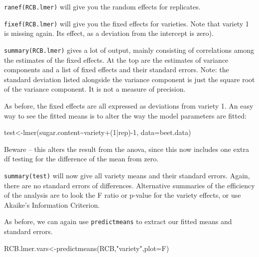 \documentclass[
]{book}
\makeatletter
\newenvironment{Shaded}{\begin{snugshade}}{\end{snugshade}}
\newcommand{\AttributeTok}[1]{\textcolor[rgb]{0.77,0.63,0.00}{#1}}
\newcommand{\DecValTok}[1]{\textcolor[rgb]{0.00,0.00,0.81}{#1}}
\newcommand{\FunctionTok}[1]{\textcolor[rgb]{0.00,0.00,0.00}{#1}}
\newcommand{\NormalTok}[1]{#1}
\newcommand{\OtherTok}[1]{\textcolor[rgb]{0.56,0.35,0.01}{#1}}
\newcommand{\SpecialCharTok}[1]{\textcolor[rgb]{0.00,0.00,0.00}{#1}}
\newcommand{\StringTok}[1]{\textcolor[rgb]{0.31,0.60,0.02}{#1}}
\newenvironment{kframe}{%
\medskip{}
\setlength{\fboxsep}{.8em}
 \def\at@end@of@kframe{}%
 \ifinner\ifhmode%
  \def\at@end@of@kframe{\end{minipage}}%
  \begin{minipage}{\columnwidth}%
 \fi\fi%
 \def\FrameCommand##1{\hskip\@totalleftmargin \hskip-\fboxsep
 \colorbox{shadecolor}{##1}\hskip-\fboxsep
     \hskip-\linewidth \hskip-\@totalleftmargin \hskip\columnwidth}%
 \MakeFramed {\advance\hsize-\width
   \@totalleftmargin\z@ \linewidth\hsize
   \@setminipage}}%
 {\par\unskip\endMakeFramed%
 \at@end@of@kframe}
\newenvironment{rmdblock}[1]
  {
  \begin{itemize}
  \renewcommand{\labelitemi}{
    \raisebox{-.7\height}[0pt][0pt]{
      {\setkeys{Gin}{width=3em,keepaspectratio}\texttt{[image: images/\#1]}}
    }
  }
  \setlength{\fboxsep}{1em}
  \begin{kframe}
  \item
  }
  {
  \end{kframe}
  \end{itemize}
  }
\newenvironment{rmdcaution}
  {\begin{rmdblock}{caution}}
  {\end{rmdblock}}
\makeatother
\begin{document}
\texttt{ranef(RCB.lmer)} will give you the random effects for replicates.

\texttt{fixef(RCB.lmer)} will give you the fixed effects for varieties. Note that variety 1 is missing again. Its effect, as a deviation from the intercept is zero).

\texttt{summary(RCB.lmer)} gives a lot of output, mainly consisting of correlations among the estimates of the fixed effects. At the top are the estimates of variance components and a list of fixed effects and their standard errors. Note: the standard deviation listed alongside the variance component is just the square root of the variance component. It is not a measure of precision.

As before, the fixed effects are all expressed as deviations from variety 1. An easy way to see the fitted means is to alter the way the model parameters are fitted:

\begin{Shaded}
\begin{Highlighting}[]
\NormalTok{test}\OtherTok{\textless{}{-}}\FunctionTok{lmer}\NormalTok{(sugar.content}\SpecialCharTok{\textasciitilde{}}\NormalTok{variety}\SpecialCharTok{+}\NormalTok{(}\DecValTok{1}\SpecialCharTok{|}\NormalTok{rep)}\SpecialCharTok{{-}}\DecValTok{1}\NormalTok{,  }\AttributeTok{data=}\NormalTok{beet.data)}
\end{Highlighting}
\end{Shaded}

\begin{rmdcaution}
Beware -- this alters the result from the anova, since this now includes one extra df testing for the difference of the mean from zero.
\end{rmdcaution}

\texttt{summary(test)} will now give all variety means and their standard errors. Again, there are no standard errors of differences. Alternative summaries of the efficiency of the analysis are to look the F ratio or p-value for the variety effects, or use Akaike's Information Criterion.

As before, we can again use \texttt{predictmeans} to extract our fitted means and standard errors.

\begin{Shaded}
\begin{Highlighting}[]
\NormalTok{RCB.lmer.vars}\OtherTok{\textless{}{-}}\FunctionTok{predictmeans}\NormalTok{(RCB,}\StringTok{"variety"}\NormalTok{,}\AttributeTok{plot=}\NormalTok{F)}
\end{Highlighting}
\end{Shaded}
\end{document}
